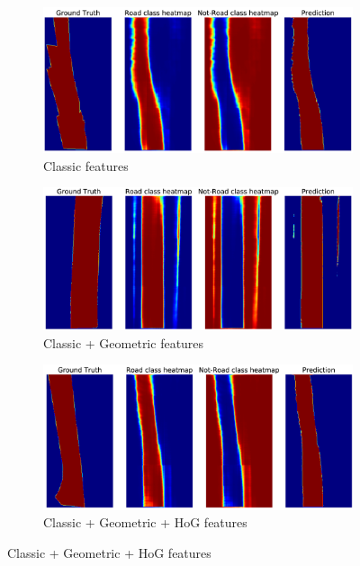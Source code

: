 \documentclass[10pt,twocolumn,letterpaper]{article}
\begin{document}
\begin{figure}[!th]
  \centering
  \begin{subfigure}[b]{\columnwidth}
    \includegraphics[width=\columnwidth]{pred_classic.png}
    \caption{Classic features}
  \end{subfigure}
  
  \begin{subfigure}[b]{\columnwidth}
    \includegraphics[width=\columnwidth]{pred_classic_geom.png}
    \caption{Classic + Geometric features}
  \end{subfigure}
  
  \begin{subfigure}[b]{\columnwidth}
    \includegraphics[width=\columnwidth]{pred_classic_hog.png}
    \caption{Classic + Geometric + HoG features}
  \end{subfigure}
  

\end{figure}
\end{document}
